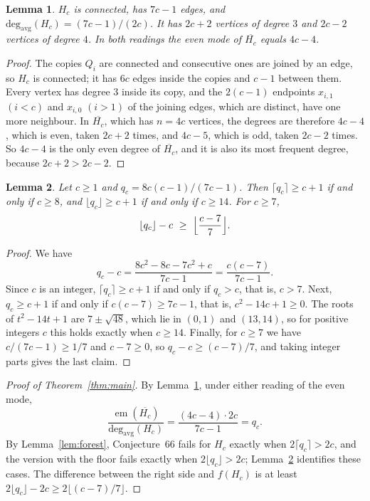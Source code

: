 \documentclass[10pt,a4paper]{article}
\newtheorem{lemma}{Lemma}[section]
\newcommand{\davg}{\operatorname{deg_{avg}}}
\newcommand{\emo}{\operatorname{em}}
\begin{document}
\begin{lemma}\label{lem:degrees}
$H_c$ is connected, has $7c-1$ edges, and $\davg(H_c)=(7c-1)/(2c)$. It has $2c+2$ vertices of degree $3$ and $2c-2$ vertices of degree $4$. In both readings the even mode of $\overline{H_c}$ equals $4c-4$.
\end{lemma}

\begin{proof}
The copies $Q_i$ are connected and consecutive ones are joined by an edge, so $H_c$ is connected; it has $6c$ edges inside the copies and $c-1$ between them. Every vertex has degree $3$ inside its copy, and the $2(c-1)$ endpoints $x_{i,1}$ $(i<c)$ and $x_{i,0}$ $(i>1)$ of the joining edges, which are distinct, have one more neighbour. In $\overline{H_c}$, which has $n=4c$ vertices, the degrees are therefore $4c-4$, which is even, taken $2c+2$ times, and $4c-5$, which is odd, taken $2c-2$ times. So $4c-4$ is the only even degree of $\overline{H_c}$, and it is also its most frequent degree, because $2c+2>2c-2$.
\end{proof}

\begin{lemma}\label{lem:arith}
Let $c\ge1$ and $q_c=8c(c-1)/(7c-1)$. Then $\lceil q_c\rceil\ge c+1$ if and only if $c\ge8$, and $\lfloor q_c\rfloor\ge c+1$ if and only if $c\ge14$. For $c\ge7$,
\[
\lfloor q_c\rfloor-c\ \ge\ \Bigl\lfloor\frac{c-7}{7}\Bigr\rfloor .
\]
\end{lemma}

\begin{proof}
We have
\[
q_c-c=\frac{8c^2-8c-7c^2+c}{7c-1}=\frac{c(c-7)}{7c-1}.
\]
Since $c$ is an integer, $\lceil q_c\rceil\ge c+1$ if and only if $q_c>c$, that is, $c>7$. Next, $q_c\ge c+1$ if and only if $c(c-7)\ge 7c-1$, that is, $c^2-14c+1\ge0$. The roots of $t^2-14t+1$ are $7\pm\sqrt{48}$, which lie in $(0,1)$ and $(13,14)$, so for positive integers $c$ this holds exactly when $c\ge14$. Finally, for $c\ge7$ we have $c/(7c-1)\ge1/7$ and $c-7\ge0$, so $q_c-c\ge(c-7)/7$, and taking integer parts gives the last claim.
\end{proof}

\begin{proof}[Proof of Theorem~\ref{thm:main}]
By Lemma~\ref{lem:degrees}, under either reading of the even mode,
\[
\frac{\emo(\overline{H_c})}{\davg(H_c)}=\frac{(4c-4)\cdot 2c}{7c-1}=q_c .
\]
By Lemma~\ref{lem:forest}, Conjecture~66 fails for $H_c$ exactly when $2\lceil q_c\rceil>2c$, and the version with the floor fails exactly when $2\lfloor q_c\rfloor>2c$; Lemma~\ref{lem:arith} identifies these cases. The difference between the right side and $f(H_c)$ is at least $2\lfloor q_c\rfloor-2c\ge2\lfloor(c-7)/7\rfloor$.
\end{proof}
\end{document}
